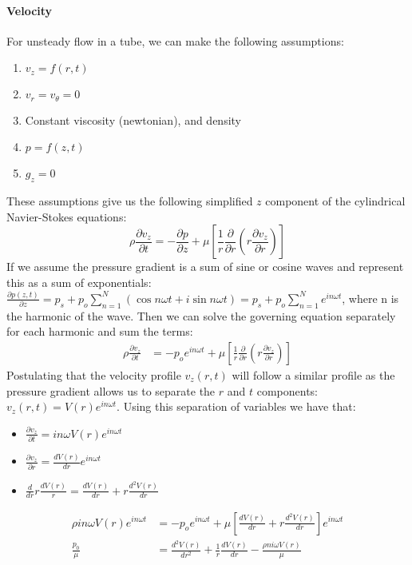 \documentclass[11pt,letterpaper]{article}
\begin{document}
\paragraph{Velocity}
For unsteady flow in a tube, we can make the following assumptions:
\begin{enumerate}
    \item $v_z = f(r,t)$
    \item $v_r = v_{\theta} = 0$
    \item Constant viscosity (newtonian), and density
    \item $p = f(z,t)$
    \item $g_z = 0$
\end{enumerate}
These assumptions give us the following simplified $z$ component of the cylindrical Navier-Stokes equations:
\begin{equation*}
\rho \frac{\partial v_z}{\partial t}  = -     \frac{\partial p}{\partial z} + \mu \left[    \frac{1}{r}\frac{\partial}{\partial r}\left(r     \frac{\partial v_z}{\partial r}\right)\right]
\end{equation*}
If we assume the pressure gradient is a sum of sine or cosine waves and represent this as a sum of exponentials: $    \frac{\partial p(z,t)}{\partial z} = p_s + p_o \sum_{n=1}^N (\cos n \omega t + i \sin n \omega t) = p_s + p_o \sum_{n=1}^N e^{i n \omega t}$, where n is the harmonic of the wave.  Then we can solve the governing equation separately for each harmonic and sum the terms:  
\begin{align*}
    \rho \frac{\partial v_z}{\partial t}  &= -     p_o e^{i n \omega t} + \mu \left[    \frac{1}{r}\frac{\partial}{\partial r}\left(r     \frac{\partial v_z}{\partial r}\right)\right]
\end{align*}
Postulating that the velocity profile $v_z(r,t)$ will follow a similar profile as the pressure gradient allows us to separate the $r$ and $t$ components: $v_z(r,t) = V(r) e^{i n \omega t}$.  Using this separation of variables we have that:
\begin{itemize}
    \item $    \frac{\partial v_z}{\partial t} = i n \omega V(r) e^{i n \omega t}$
    \item      $ \frac{\partial v_z}{\partial r} = \frac{d V(r)}{d r} e^{i n \omega t}$
    \item $\frac{d}{d r} r \frac{d V(r)}{r} = \frac{d V(r)}{d r} + r \frac{d^2 V(r)}{d r}$
\end{itemize}
\begin{align*}
    \rho i n \omega V(r) e^{i n \omega t}  &= -     p_o e^{i n \omega t} + \mu   \left[  \frac{d V(r)}{d r} + r \frac{d^2 V(r)}{d r}   \right] e^{i n \omega t} \\
    \frac{p_0}{\mu} &=\frac{d^2 V(r)}{d r^2} + \frac{1}{r} \frac{d V(r)}{d r} - \frac{\rho n i \omega V(r)}{\mu} 
\end{align*}
\end{document}
